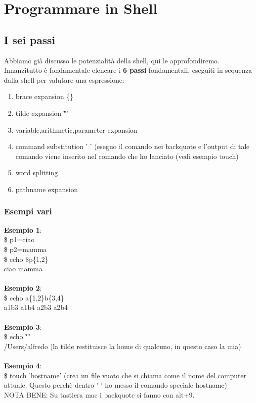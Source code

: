 \documentclass[a4paper,12pt]{article} %
\begin{document}
\section{Programmare in Shell}
\subsection{I sei passi}
Abbiamo già discusso le potenzialità della shell, qui le approfondiremo. Innanzitutto è fondamentale elencare i \textbf{6 passi} fondamentali, eseguiti in sequenza dalla shell per valutare una espressione:
\begin{enumerate}
\item brace expansion \{\}
\item tilde expansion \~""
\item variable,arithmetic,parameter expansion
\item command substitution ' ' (eseguo il comando nei backquote e l'output di tale comando viene inserito nel comando che ho lanciato (vedi esempio touch)
\item word splitting
\item pathname expansion
\end{enumerate}

\subsubsection{Esempi vari}
\textbf{Esempio 1}:\\
\$ p1=ciao\\
\$ p2=mamma\\
\$ echo \$p\{1,2\}\\
ciao mamma\\ \\
\textbf{Esempio 2}:\\
\$ echo a\{1,2\}b\{3,4\}\\
a1b3 a1b4 a2b3 a2b4\\ \\
\textbf{Esempio 3}:\\
\$ echo \~"" \\
/Users/alfredo (la tilde restituisce la home di qualcuno, in questo caso la mia)\\ \\
\textbf{Esempio 4}:\\
\$ touch 'hostname' (crea un file vuoto che si chiama come il nome del computer attuale. Questo perchè dentro ' ' ho messo il comando speciale hostname)\\
NOTA BENE:  Su tastiera mac i backquote si fanno con alt+9.
\end{document}
